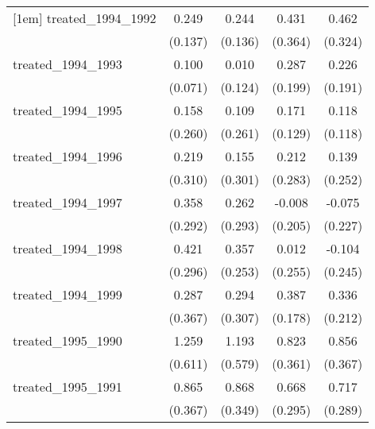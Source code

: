 {\begin{tabular}{l*{4}{c}}
[1em]
treated\_1994\_1992&       0.249         &       0.244         &       0.431         &       0.462         \\
            &     (0.137)         &     (0.136)         &     (0.364)         &     (0.324)         \\
[1em]
treated\_1994\_1993&       0.100         &       0.010         &       0.287         &       0.226         \\
            &     (0.071)         &     (0.124)         &     (0.199)         &     (0.191)         \\
[1em]
treated\_1994\_1995&       0.158         &       0.109         &       0.171         &       0.118         \\
            &     (0.260)         &     (0.261)         &     (0.129)         &     (0.118)         \\
[1em]
treated\_1994\_1996&       0.219         &       0.155         &       0.212         &       0.139         \\
            &     (0.310)         &     (0.301)         &     (0.283)         &     (0.252)         \\
[1em]
treated\_1994\_1997&       0.358         &       0.262         &      -0.008         &      -0.075         \\
            &     (0.292)         &     (0.293)         &     (0.205)         &     (0.227)         \\
[1em]
treated\_1994\_1998&       0.421         &       0.357         &       0.012         &      -0.104         \\
            &     (0.296)         &     (0.253)         &     (0.255)         &     (0.245)         \\
[1em]
treated\_1994\_1999&       0.287         &       0.294         &       0.387\sym{*}  &       0.336         \\
            &     (0.367)         &     (0.307)         &     (0.178)         &     (0.212)         \\
[1em]
treated\_1995\_1990&       1.259\sym{*}  &       1.193\sym{*}  &       0.823\sym{*}  &       0.856\sym{*}  \\
            &     (0.611)         &     (0.579)         &     (0.361)         &     (0.367)         \\
[1em]
treated\_1995\_1991&       0.865\sym{*}  &       0.868\sym{*}  &       0.668\sym{*}  &       0.717\sym{*}  \\
            &     (0.367)         &     (0.349)         &     (0.295)         &     (0.289)         \\

\end{tabular}}

